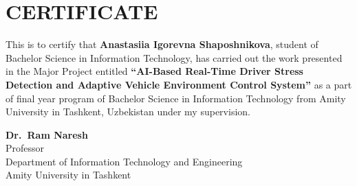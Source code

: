 \chapter*{CERTIFICATE}

This is to certify that \textbf{Anastasiia Igorevna Shaposhnikova}, student of Bachelor
Science in Information Technology, has carried out the work presented in the Major Project
entitled \textbf{``AI-Based Real-Time Driver Stress Detection and Adaptive Vehicle
Environment Control System''} as a part of final year program of Bachelor Science in
Information Technology from Amity University in Tashkent, Uzbekistan under my supervision.

\vspace{3cm}
\noindent\textbf{Dr.\ Ram Naresh}\\
Professor\\
Department of Information Technology and Engineering\\
Amity University in Tashkent
